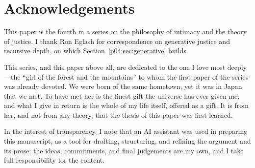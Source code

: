 \section*{Acknowledgements}
This paper is the fourth in a series on the philosophy of intimacy and the
theory of justice. I thank Ron Eglash for correspondence on generative
justice and recursive depth, on which Section~\ref{p04:sec:generative} builds.

This series, and this paper above all, are dedicated to the one I love most
deeply---the ``girl of the forest and the mountains'' to whom the first paper of the series was already
devoted. We were born of the same hometown, yet it was in Japan that we met.
To have met her is the finest gift the universe has ever given me; and what I
give in return is the whole of my life itself, offered as a gift. It is from
her, and not from any theory, that the thesis of this paper was first
learned.

In the interest of transparency, I note that an AI assistant was used in
preparing this manuscript, as a tool for drafting, structuring, and refining
the argument and its prose; the ideas, commitments, and final judgements are
my own, and I take full responsibility for the content.

\begin{center}
\end{center}

